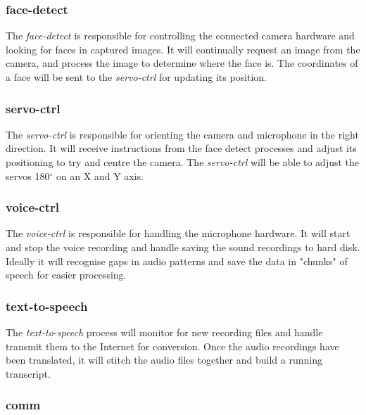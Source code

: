 \documentclass[11pt,a4paper,titlepage]{report}
\begin{document}
\subsubsection{face-detect}

The \textit{face-detect} is responsible for controlling the connected camera hardware and looking for faces in captured images. It will continually request an image from the camera, and process the image to determine where the face is. The coordinates of a face will be sent to the \textit{servo-ctrl} for updating its position.


\subsubsection{servo-ctrl}

The \textit{servo-ctrl} is responsible for orienting the camera and microphone in the right direction. It will receive instructions from the face detect processes and adjust its positioning to try and centre the camera. The \textit{servo-ctrl} will be able to adjust the servos 180$^\circ$ on an X and Y axis.


\subsubsection{voice-ctrl}

The \textit{voice-ctrl} is responsible for handling the microphone hardware. It will start and stop the voice recording and handle saving the sound recordings to hard disk. Ideally it will recognise gaps in audio patterns and save the data in "chunks" of speech for easier processing. 



\subsubsection{text-to-speech}

The \textit{text-to-speech} process will monitor for new recording files and handle transmit them to the Internet for conversion. Once the audio recordings have been translated, it will stitch the audio files together and build a running transcript.


\subsubsection{comm}
\end{document}
